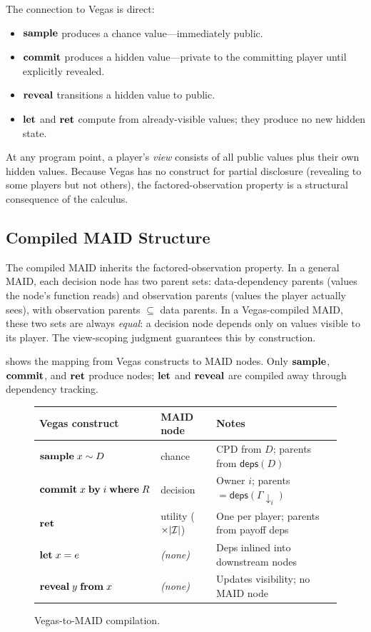 \documentclass[11pt]{article}
\begin{document}
The connection to Vegas is direct:
\begin{itemize}[nosep]
\item $\mathbf{sample}$ produces a chance value---immediately public.
\item $\mathbf{commit}$ produces a hidden value---private to the committing player until
      explicitly revealed.
\item $\mathbf{reveal}$ transitions a hidden value to public.
\item $\mathbf{let}$ and $\mathbf{ret}$ compute from already-visible values; they produce no new
      hidden state.
\end{itemize}
At any program point, a player's \emph{view} consists of all public values plus
their own hidden values. Because Vegas has no construct for partial disclosure
(revealing to some players but not others), the factored-observation property
is a structural consequence of the calculus.

\subsection{Compiled MAID Structure}\label{sec:maid-structure}

The compiled MAID inherits the factored-observation property. In a general
MAID, each decision node has two parent sets: data-dependency parents (values
the node's function reads) and observation parents (values the player actually
sees), with observation parents $\subseteq$ data parents. In a Vegas-compiled
MAID, these two sets are always \emph{equal}: a decision node depends only on
values visible to its player. The view-scoping judgment guarantees this by
construction.

 shows the mapping from Vegas constructs to MAID nodes.
Only $\mathbf{sample}$, $\mathbf{commit}$, and $\mathbf{ret}$ produce nodes; $\mathbf{let}$ and $\mathbf{reveal}$ are
compiled away through dependency tracking.

\begin{figure}[ht]
\centering
\renewcommand{\arraystretch}{1.3}
\begin{tabular}{@{}lll@{}}
\toprule
Vegas construct & MAID node & Notes \\
\midrule
$\mathbf{sample}\;x \sim D$ & chance & CPD from $D$; parents from $\mathsf{deps}(D)$ \\
$\mathbf{commit}\;x\;\mathbf{by}\;i\;\mathbf{where}\;R$
  & decision & Owner $i$; parents $= \mathsf{deps}(\Gamma\!\!\downarrow_i)$ \\
$\mathbf{ret}$ & utility ($\times |\mathcal{I}|$) & One per player; parents from payoff deps \\
$\mathbf{let}\;x = e$ & \emph{(none)} & Deps inlined into downstream nodes \\
$\mathbf{reveal}\;y\;\mathbf{from}\;x$ & \emph{(none)} & Updates visibility; no MAID node \\
\bottomrule
\end{tabular}
\caption{Vegas-to-MAID compilation.}\label{fig:compilation}
\end{figure}
\end{document}
